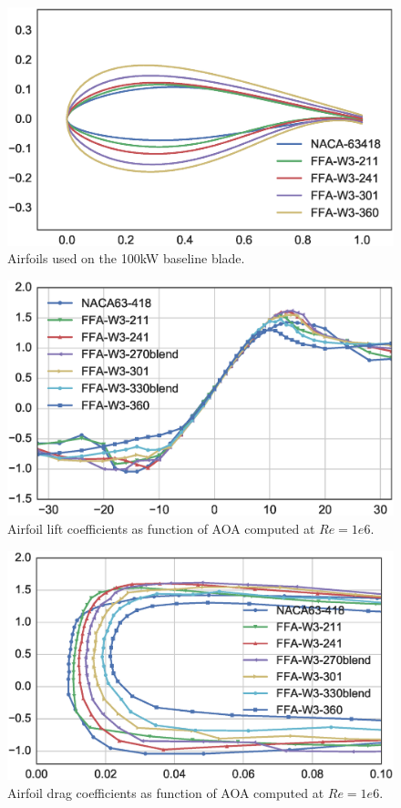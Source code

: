 \begin{figure}[!ht]
\begin{center}
	\includegraphics[width=0.8\linewidth]{figures/KB_airfoil_series.eps}
\end{center}
\caption{Airfoils used on the 100kW baseline blade.}
\label{fig:baseline_airfoils}
\end{figure}

\begin{figure}[!ht]
\begin{center}
	\includegraphics[width=0.8\linewidth]{figures/KB_airfoil_data_cl_detail.eps}
\end{center}
\caption{Airfoil lift coefficients as function of AOA computed at $Re=1e6$.}
\label{fig:baseline_cl}
\end{figure}

\begin{figure}[!ht]
\begin{center}
	\includegraphics[width=0.8\linewidth]{figures/KB_airfoil_data_cd_detail.eps}
\end{center}
\caption{Airfoil drag coefficients as function of AOA computed at $Re=1e6$.}
\label{fig:baseline_cd}
\end{figure}


